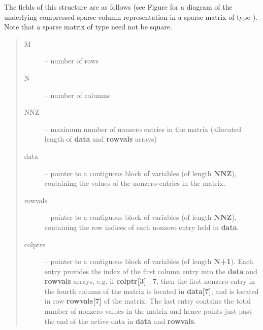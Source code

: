 \documentclass[letterpaper,10pt,english]{sphinxmanual}
\begin{document}
The fields of this structure are as follows (see Figure
{\hyperref[linear_solvers/SLS:sls-figure]{\emph{}}}
for a diagram of the underlying compressed-sparse-column
representation in a sparse matrix of type {\hyperref[linear_solvers/SLS:c.SlsMat]{\emph{}}}).  Note that a
sparse matrix of type {\hyperref[linear_solvers/SLS:c.SlsMat]{\emph{}}} need not be square.
\begin{quote}\begin{description}
\item[{M}] \leavevmode
-- number of rows

\item[{N}] \leavevmode
--  number of columns

\item[{NNZ}] \leavevmode
-- maximum number of nonzero entries in the matrix (allocated
length of \textbf{data} and \textbf{rowvals} arrays)

\item[{data}] \leavevmode
-- pointer to a contiguous block of  variables (of
length \textbf{NNZ}), containing the values of the nonzero entries in the
matrix.

\item[{rowvals}] \leavevmode
-- pointer to a contiguous block of  variables (of
length \textbf{NNZ}), containing the row indices of each nonzero
entry held in \textbf{data}.

\item[{colptrs}] \leavevmode
-- pointer to a contiguous block of  variables (of
length \textbf{N+1}).  Each entry provides the index of the first column
entry into the \textbf{data} and \textbf{rowvals} arrays, e.g. if
\textbf{colptr{[}3{]}=7}, then the first nonzero entry in the fourth column
of the matrix is located in \textbf{data{[}7{]}}, and is located in row
\textbf{rowvals{[}7{]}} of the matrix.  The last entry contains the total
number of nonzero values in the matrix and hence points just past
the end of the active data in \textbf{data} and \textbf{rowvals}.

\end{description}\end{quote}
\end{document}
